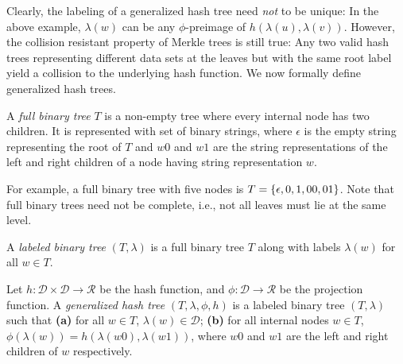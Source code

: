 Clearly, the labeling of a generalized hash tree need \emph{not} to be unique: In the above example, $\lambda(w)$ can be any $\phi$-preimage of $h(\lambda(u),\lambda(v))$. However, the collision resistant property of Merkle trees is still true: Any two valid hash trees representing different data sets at the leaves but with the same root label yield a collision to the underlying hash function. We now formally define generalized hash trees.
\begin{defn}\label{full_bin_def}
A \emph{full binary tree} $T$ is a non-empty tree where every internal node has two children. It is represented with set of binary strings, where $\epsilon$ is the empty string representing the root of $T$ and $w0$ and $w1$ are the string representations of the left and right children of a node having string representation $w$. 
\end{defn}

For example, a full binary tree with five nodes is $T=\{\epsilon,0,1,00,\\01\}$. Note that full binary trees need not be complete, i.e., not all leaves must lie at the same level.
\begin{defn}
A \emph{labeled binary tree} $(T,\lambda)$ is a full binary tree $T$ along with labels $\lambda(w)$ for all $w\in T$. 
\end{defn}

\begin{defn}\label{def_generalized}
Let $h: \mathcal{D}\times \mathcal{D}\rightarrow \mathcal{R}$ be the hash function, and $\phi: \mathcal{D}\rightarrow \mathcal{R}$ be the projection function. A \emph{generalized hash tree} $(T,\lambda,\phi,h)$ is a labeled binary tree $(T,\lambda)$ such that \textbf{(a)} for all $w\in T$, $\lambda(w)\in \mathcal{D}$; \textbf{(b)} for all internal nodes $w\in T$, $\phi(\lambda(w))=h(\lambda(w0),\lambda(w1))$,
where $w0$ and $w1$ are the left and right children of $w$ respectively.%
\end{defn}

